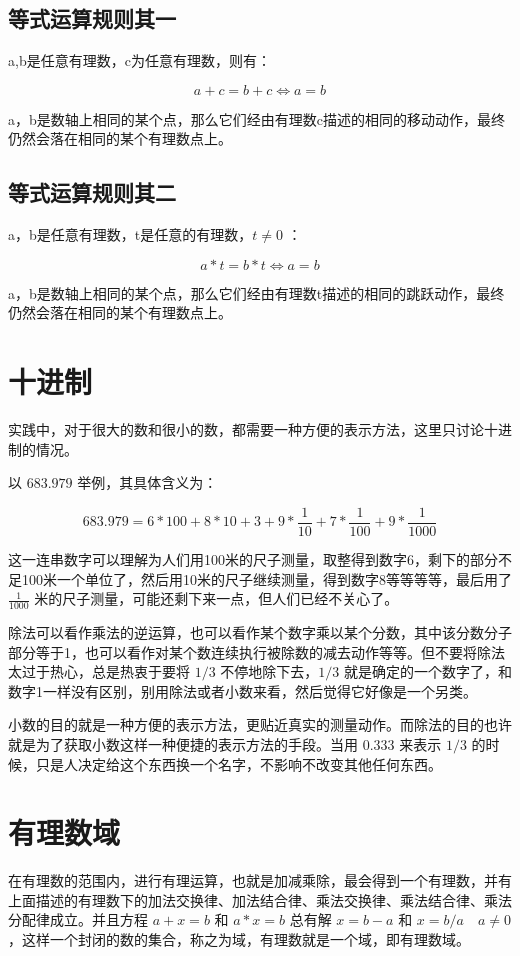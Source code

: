 \documentclass[12pt,oneside]{book}
\begin{document}
\subsection{等式运算规则其一}
a,b是任意有理数，c为任意有理数，则有：

\begin{equation}
a+c = b+c \Leftrightarrow a=b
\end{equation}

a，b是数轴上相同的某个点，那么它们经由有理数c描述的相同的移动动作，最终仍然会落在相同的某个有理数点上。


\subsection{等式运算规则其二}
a，b是任意有理数，t是任意的有理数，$t \neq 0$ ：

\begin{equation}
a*t=b*t \Leftrightarrow a=b
\end{equation}

a，b是数轴上相同的某个点，那么它们经由有理数t描述的相同的跳跃动作，最终仍然会落在相同的某个有理数点上。


\section{十进制}
实践中，对于很大的数和很小的数，都需要一种方便的表示方法，这里只讨论十进制的情况。

以 $683.979$ 举例，其具体含义为：

\[
683.979 = 6*100 + 8 * 10 + 3 + 9*\frac{1}{10} + 7 * \frac{1}{100} + 9 * \frac{1}{1000}
\]

这一连串数字可以理解为人们用100米的尺子测量，取整得到数字6，剩下的部分不足100米一个单位了，然后用10米的尺子继续测量，得到数字8等等等等，最后用了 $\frac{1}{1000}$ 米的尺子测量，可能还剩下来一点，但人们已经不关心了。

除法可以看作乘法的逆运算，也可以看作某个数字乘以某个分数，其中该分数分子部分等于1，也可以看作对某个数连续执行被除数的减去动作等等。但不要将除法太过于热心，总是热衷于要将 $1/3$ 不停地除下去，$1/3$ 就是确定的一个数字了，和数字1一样没有区别，别用除法或者小数来看，然后觉得它好像是一个另类。

小数的目的就是一种方便的表示方法，更贴近真实的测量动作。而除法的目的也许就是为了获取小数这样一种便捷的表示方法的手段。当用 $0.333$ 来表示 $1/3$ 的时候，只是人决定给这个东西换一个名字，不影响不改变其他任何东西。



\section{有理数域}
在有理数的范围内，进行有理运算，也就是加减乘除，最会得到一个有理数，并有上面描述的有理数下的加法交换律、加法结合律、乘法交换律、乘法结合律、乘法分配律成立。并且方程 $a + x = b$ 和 $a*x=b$ 总有解 $x = b-a$ 和 $x = b/a \quad a\neq 0$ ，这样一个封闭的数的集合，称之为域，有理数就是一个域，即有理数域。
\end{document}

